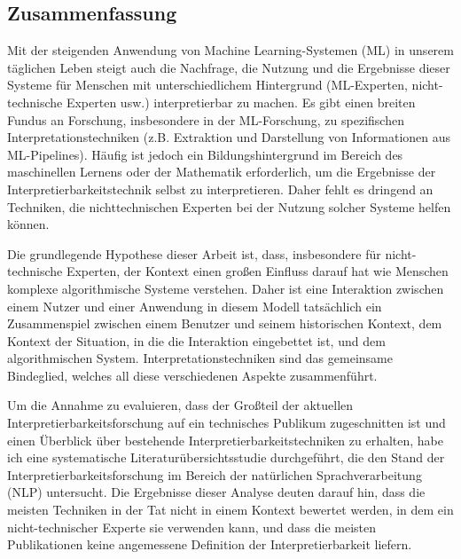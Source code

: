 %
\pagestyle{empty}

\subsection*{Zusammenfassung}

Mit der steigenden Anwendung von Machine Learning-Systemen (ML) in unserem täglichen Leben steigt auch die Nachfrage, die Nutzung und die Ergebnisse dieser Systeme für Menschen mit unterschiedlichem Hintergrund (ML-Experten, nicht-technische Experten usw.) interpretierbar zu machen. Es gibt einen breiten Fundus an Forschung, insbesondere in der ML-Forschung, zu spezifischen Interpretationstechniken (z.B. Extraktion und Darstellung von Informationen aus ML-Pipelines). Häufig ist jedoch ein Bildungshintergrund im Bereich des maschinellen Lernens oder der Mathematik erforderlich, um die Ergebnisse der Interpretierbarkeitstechnik selbst zu interpretieren. Daher fehlt es dringend an Techniken, die nichttechnischen Experten bei der Nutzung solcher Systeme helfen können.

Die grundlegende Hypothese dieser Arbeit ist, dass, insbesondere für nicht-technische Experten, der Kontext einen großen Einfluss darauf hat wie Menschen komplexe algorithmische Systeme verstehen. Daher ist eine Interaktion zwischen einem Nutzer und einer Anwendung in diesem Modell tatsächlich ein Zusammenspiel zwischen einem Benutzer und seinem historischen Kontext, dem Kontext der Situation, in die die Interaktion eingebettet ist, und dem algorithmischen System. Interpretationstechniken sind das gemeinsame Bindeglied, welches all diese verschiedenen Aspekte zusammenführt.

Um die Annahme zu evaluieren, dass der Großteil der aktuellen Interpretierbarkeitsforschung auf ein technisches Publikum zugeschnitten ist und einen Überblick über bestehende Interpretierbarkeitstechniken zu erhalten, habe ich eine systematische Literaturübersichtsstudie durchgeführt, die den Stand der Interpretierbarkeitsforschung im Bereich der natürlichen Sprachverarbeitung (NLP) untersucht. Die Ergebnisse dieser Analyse deuten darauf hin, dass die meisten Techniken in der Tat nicht in einem Kontext bewertet werden, in dem ein nicht-technischer Experte sie verwenden kann, und dass die meisten Publikationen keine angemessene Definition der Interpretierbarkeit liefern.


